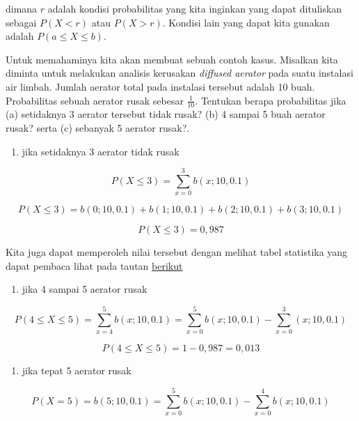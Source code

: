 \documentclass[]{book}
\providecommand{\tightlist}{%
  \setlength{\itemsep}{0pt}\setlength{\parskip}{0pt}}
\begin{document}
dimana \(r\) adalah kondisi probabilitas yang kita inginkan yang dapat
dituliskan sebagai \(P\left(X<r\right)\) atau \(P\left(X>r\right)\).
Kondisi lain yang dapat kita gunakan adalah
\(P\left(a\le X\le b\right)\).

Untuk memahaminya kita akan membuat sebuah contoh kasus. Misalkan kita
diminta untuk melakukan analisis kerusakan \emph{diffused aerator} pada
suatu instalasi air limbah. Jumlah aerator total pada instalasi tersebut
adalah 10 buah. Probabilitas sebuah aerator rusak sebesar
\(\frac{1}{10}\). Tentukan berapa probabilitas jika (a) setidaknya 3
aerator tersebut tidak rusak? (b) 4 sampai 5 buah aerator rusak? serta
(c) sebanyak 5 aerator rusak?.

\begin{enumerate}
\def\labelenumi{(\alph{enumi})}
\tightlist
\item
  jika setidaknya 3 aerator tidak rusak
\end{enumerate}

\[
P\left(X\le 3\right)=\sum _{x=0}^3b\left(x;10,0.1\right)
\]

\[
P\left(X\le3\right)=b\left(0;10,0.1\right)+b\left(1;10,0.1\right)+b\left(2;10,0.1\right)+b\left(3;10,0.1\right)
\]

\[
P\left(X\le3\right)=0,987
\]

Kita juga dapat memperoleh nilai tersebut dengan melihat tabel
statistika yang dapat pembaca lihat pada tautan
\href{https://onlinepubs.trb.org/onlinepubs/nchrp/cd-22/manual/v2appendixc.pdf}{berikut}

\begin{enumerate}
\def\labelenumi{(\alph{enumi})}
\setcounter{enumi}{1}
\tightlist
\item
  jika 4 sampai 5 aerator rusak
\end{enumerate}

\[
P\left(4\le X\le5\right)=\sum_{x=4}^5b\left(x;10,0.1\right)=\sum_{x=0}^5b\left(x;10,0.1\right)-\sum_{x=0}^3\left(x;10,0.1\right)
\]

\[
P\left(4\le X\le5\right)=1-0,987=0,013
\]

\begin{enumerate}
\def\labelenumi{(\alph{enumi})}
\setcounter{enumi}{2}
\tightlist
\item
  jika tepat 5 aerator rusak
\end{enumerate}

\[
P\left(X=5\right)=b\left(5;10,0.1\right)=\sum_{x=0}^5b\left(x;10,0.1\right)-\sum_{x=0}^4b\left(x;10,0.1\right)
\]
\end{document}
